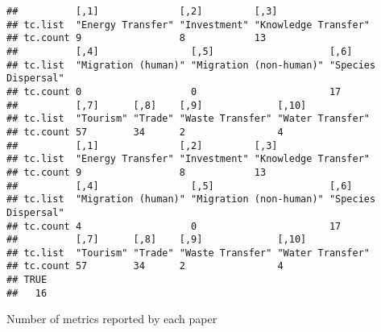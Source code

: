 \documentclass[
]{article}
\newenvironment{Shaded}{\begin{snugshade}}{\end{snugshade}}
\newcommand{\CommentTok}[1]{\textcolor[rgb]{0.56,0.35,0.01}{\textit{#1}}}
\newcommand{\DataTypeTok}[1]{\textcolor[rgb]{0.13,0.29,0.53}{#1}}
\newcommand{\KeywordTok}[1]{\textcolor[rgb]{0.13,0.29,0.53}{\textbf{#1}}}
\newcommand{\NormalTok}[1]{#1}
\newcommand{\OperatorTok}[1]{\textcolor[rgb]{0.81,0.36,0.00}{\textbf{#1}}}
\newcommand{\StringTok}[1]{\textcolor[rgb]{0.31,0.60,0.02}{#1}}
\begin{document}
\begin{verbatim}
##          [,1]              [,2]         [,3]                
## tc.list  "Energy Transfer" "Investment" "Knowledge Transfer"
## tc.count 9                 8            13                  
##          [,4]                [,5]                    [,6]               
## tc.list  "Migration (human)" "Migration (non-human)" "Species Dispersal"
## tc.count 0                   0                       17                 
##          [,7]      [,8]    [,9]             [,10]           
## tc.list  "Tourism" "Trade" "Waste Transfer" "Water Transfer"
## tc.count 57        34      2                4               
##          [,1]              [,2]         [,3]                
## tc.list  "Energy Transfer" "Investment" "Knowledge Transfer"
## tc.count 9                 8            13                  
##          [,4]                [,5]                    [,6]               
## tc.list  "Migration (human)" "Migration (non-human)" "Species Dispersal"
## tc.count 4                   0                       17                 
##          [,7]      [,8]    [,9]             [,10]           
## tc.list  "Tourism" "Trade" "Waste Transfer" "Water Transfer"
## tc.count 57        34      2                4               
## TRUE 
##   16
\end{verbatim}

Number of metrics reported by each paper

\begin{Shaded}
\end{Shaded}
\end{document}
